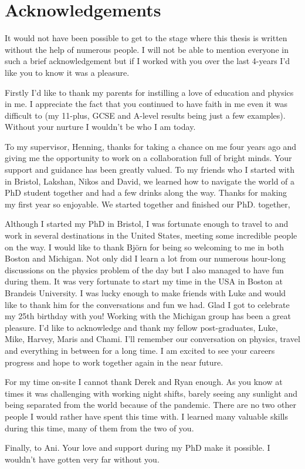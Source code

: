 %
%

\chapter*{Acknowledgements}
\begin{SingleSpace}
\par
It would not have been possible to get to the stage where this thesis is written without the help of numerous people.
I will not be able to mention everyone in such a brief acknowledgement but if I worked with you over the last 4-years I'd like you to know it was a pleasure.
\par
Firstly I'd like to thank my parents for instilling a love of education and physics in me. I appreciate the fact that you continued to have faith in me even it was difficult to (my 11-plus, GCSE and A-level results being just a few examples).
Without your nurture I wouldn't be who I am today.
\par
To my supervisor, Henning, thanks for taking a chance on me four years ago and giving me the opportunity to work on a collaboration full of bright minds. 
Your support and guidance has been greatly valued.
To my friends who I started with in Bristol, Lakshan, Nikos and David, we learned how to navigate the world of a PhD student together and had a few drinks along the way. 
Thanks for making my first year so enjoyable.
We started together and finished our PhD. together,
\par
Although I started my PhD in Bristol, I was fortunate enough to travel  to and work in several destinations in the United States, meeting some incredible people on the way. I would like to thank Bj\"{o}rn for being so welcoming to me in both Boston and Michigan. Not only did I learn a lot from our numerous hour-long discussions on the physics problem of the day but I also managed to have fun during them. 
It was very fortunate to start my time in the USA in Boston at Brandeis University. I was lucky enough to make friends with Luke and would like to thank him for the conversations and fun we had. Glad I got to celebrate my 25th birthday with you!
Working with the Michigan group has been a great pleasure. I'd like to acknowledge and thank my fellow post-graduates, Luke, Mike, Harvey, Maris and Chami. I'll remember our conversation on physics, travel and everything in between for a long time. I am excited to see your careers progress and hope to work together again in the near future.
\par
For my time on-site I cannot thank Derek and Ryan enough. As you know at times it was challenging with working night shifts, barely seeing any sunlight and being separated from the world because of the pandemic. There are no two other people I would rather have spent this time with. I learned many valuable skills during this time, many of them from the two of you. 
\par


\par
Finally, to Ani.
Your love and support during my PhD make it possible.
I wouldn't have gotten very far without you.

\end{SingleSpace}
\clearpage